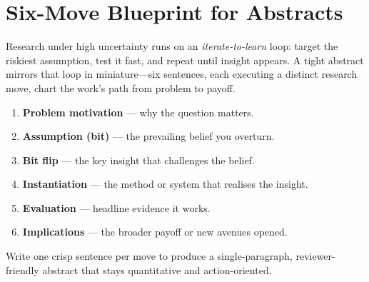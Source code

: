 
\section{Six-Move Blueprint for Abstracts}
\label{sec:abstract_blueprint}

Research under high uncertainty runs on an \emph{iterate-to-learn} loop: target
the riskiest assumption, test it fast, and repeat until insight appears.
A tight abstract mirrors that loop in miniature---six sentences, each executing a
distinct research move, chart the work's path from problem to payoff.

\begin{enumerate}[label=\textbf{\arabic*.}, leftmargin=*]
    \item \textbf{Problem motivation} --- why the question matters.
    \item \textbf{Assumption (bit)} --- the prevailing belief you overturn.
    \item \textbf{Bit flip} --- the key insight that challenges the belief.
    \item \textbf{Instantiation} --- the method or system that realises the insight.
    \item \textbf{Evaluation} --- headline evidence it works.
    \item \textbf{Implications} --- the broader payoff or new avenues opened.
\end{enumerate}

Write one crisp sentence per move to produce a single-paragraph,
reviewer-friendly abstract that stays quantitative and action-oriented.
